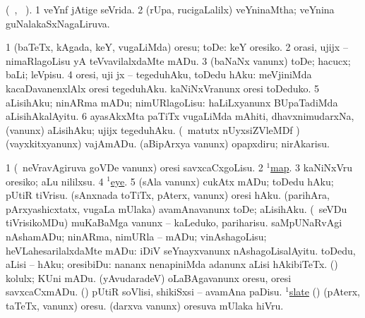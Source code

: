 \bentry
{}
\gl{\gu} (\tara\ , \tama\ ).
\bmng
\bnum
\num{1} veYnf jAtige seVrida. 
\num{2} (rUpa, rucigaLalilx) veYninaMtha; veYnina guNalakaSxNagaLiruva. 
\enum
\emng
\eentry

\bentry
{} 
\gl{\sakirx}
\expl{}
\bmng
\bnum
\num{1} (baTeTx, kAgada, keY, \mo vugaLiMda) oresu; toDe:  keY oresiko. 
\num{2} orasi, ujijx -- nimaRlagoLisu yA teVvavilalxdaMte mADu. 
\num{3} (baNaNx \mo vanunx) toDe; hacucx; baLi; leVpisu. 
\num{4} oresi, uji jx -- tegeduhAku, toDedu hAku:  meVjiniMda kacaDavanenxlAlx oresi tegeduhAku.  kaNiNxVranunx oresi toDeduko. 
\num{5} aLisihAku; ninARma mADu; nimURlagoLisu:  haLiLxyanunx BUpaTadiMda aLisihAkalAyitu. 
\num{6} ayasAkxMta paTiTx \mo vugaLiMda mAhiti, dhavxnimudarxNa, (\mo vanunx) aLisihAku; ujijx tegeduhAku. 
 (\AseTxrXV\ matutx nUyxsiZVleMDf \ashi) 
\banum
{} (vayxkitxyanunx) vajAmADu. 
 (aBipArxya \mo vanunx) opapxdiru; nirAkarisu. 
\eanum
\numie
\enum
\emng

\noindent
\gl{\pagu}
\bmng
\bnum
\num{1}  (\kanmu\ neVravAgiruva goVDe \mo vanunx) oresi savxcaCxgoLisu. 
\num{2}  \hyperref{kandict_m.pdf}{M}{map(1) pagu(4)}{$^1$map}. 
\num{3}  kaNiNxVru oresiko; aLu nililxsu. 
\num{4}  \hyperref{kandict_e.pdf}{E}{eye(1) nuga(53)}{$^1$eye}. 
\num{5}  (sAla \mo vanunx) cukAtx mADu; toDedu hAku; pUtiR tiVrisu. 
  
\banum
{} (sAnxnada toTiTx, pAterx, \mo vanunx) oresi hAku. 
 (parihAra, pArxyashicxtatx, \mo vugaLa mUlaka) avamAnavanunx toDe; aLisihAku. 
 (\kanmu\ seVDu tiVrisikoMDu) muKaBaMga \mo vanunx -- kaLeduko, pariharisu. 
 saMpUNaRvAgi nAshamADu; ninARma, nimURla -- mADu; vinAshagoLisu; heVLahesarilalxdaMte mADu:  iDiV seYnayxvanunx nAshagoLisalAyitu. 
 toDedu, aLisi -- hAku; oresibiDu:  nananx nenapiniMda adanunx aLisi hAkibiTeTx. 
 (\ashi) kolulx; KUni mADu. 
 (yAvudaradeV) oLaBAgavanunx oresu, oresi savxcaCxmADu. 
\eanum
\numie
{} 
\banum
{}  (\AmA) pUtiR soVlisi, shikiSxsi -- avamAna paDisu. 
  \hyperref{kandict_s.pdf}{S}{slate(1) pagu(5)}{$^1$slate}  
\eanum
\numie
{}  
\banum
{} (\birx) (pAterx, taTeTx, \mo vanunx) oresu. 
 (darxva \mo vanunx) oresuva mUlaka hiVru. 
\eanum
\numie
\enum
\emng
\eentry

